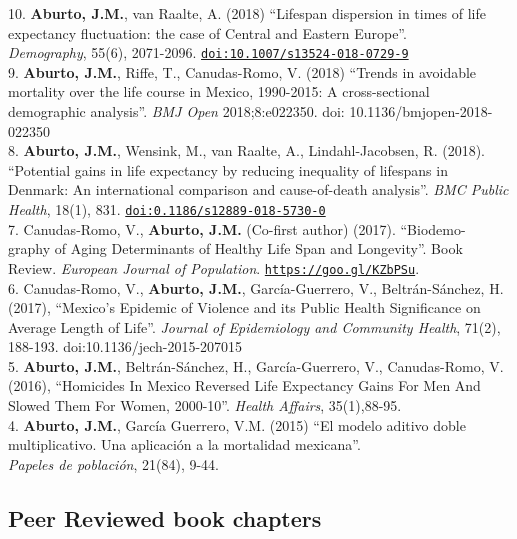 \documentclass[12pt]{article}
\providecommand*\url[1]{\href{#1}{#1}}
\renewcommand*\url[1]{\href{#1}{\texttt{#1}}}
\begin{document}
10. \textbf{Aburto, J.M.}, van Raalte, A. (2018) ``Lifespan dispersion in times of life expectancy fluctuation: the case of Central and Eastern Europe''.\\ \textit{Demography}, 55(6), 2071-2096. \url{doi:10.1007/s13524-018-0729-9} \\

9. \textbf{Aburto, J.M.}, Riffe, T., Canudas-Romo, V. (2018) ``Trends in avoidable mortality over the life course in Mexico, 1990-2015:  A cross-sectional demographic analysis''. \emph{BMJ Open} 2018;8:e022350. doi: 10.1136/bmjopen-2018-022350 \\


8. \textbf{Aburto, J.M.}, Wensink, M., van Raalte, A., Lindahl-Jacobsen, R. (2018). ``Potential gains in life expectancy by reducing inequality of lifespans in Denmark: An international comparison and cause-of-death analysis''. \emph{BMC Public Health}, 18(1), 831. \url{doi:0.1186/s12889-018-5730-0} \\
  
7. Canudas-Romo, V.,  \textbf{Aburto, J.M.} (Co-first author) (2017). ``Biodemo- \\ graphy of Aging Determinants of Healthy Life Span and Longevity''. Book Review. \emph{European Journal of Population}. \url{https://goo.gl/KZbPSu}. \\ 

6. Canudas-Romo, V.,  \textbf{Aburto, J.M.}, Garc\'ia-Guerrero, V., Beltr\'an-S\'anchez, H. (2017),  ``Mexico's Epidemic of Violence and its Public Health Significance on Average Length of Life''. \emph{Journal of Epidemiology and Community Health}, 71(2), 188-193. doi:10.1136/jech-2015-207015 \\ 
	 
5. \textbf{Aburto, J.M.}, Beltr\'an-S\'anchez, H., Garc\'ia-Guerrero, V., Canudas-Romo, V. (2016), ``Homicides In Mexico Reversed Life Expectancy Gains For Men And Slowed Them For Women, 2000-10''. \emph{Health Affairs}, 35(1),88-95. \\ 
		     
4. \textbf{Aburto, J.M.}, Garc\'ia Guerrero, V.M. (2015) ``El modelo aditivo doble multiplicativo. Una aplicaci\'on a la mortalidad mexicana''.\\  \emph{Papeles de poblaci\'on}, 21(84), 9-44. \\
		  
\subsection*{Peer Reviewed book chapters}
\end{document}
